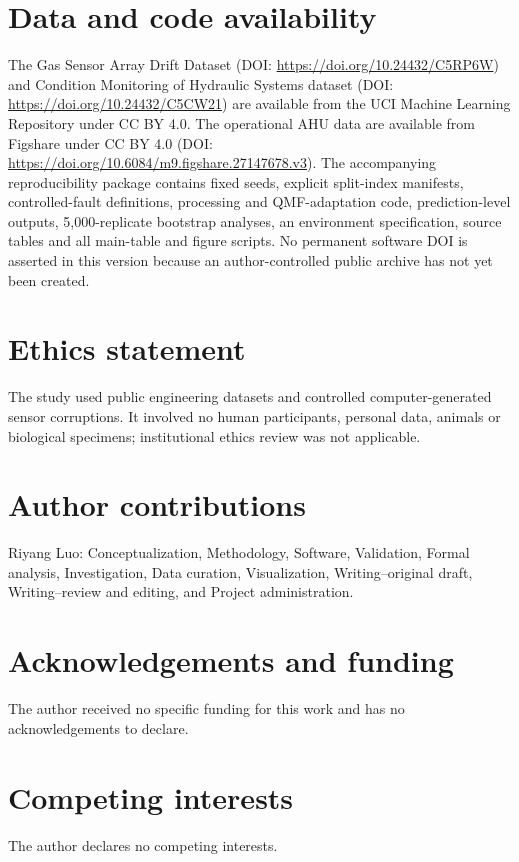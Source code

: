 \documentclass[11pt]{article}
\begin{document}
\section*{Data and code availability}

The Gas Sensor Array Drift Dataset (DOI: \url{https://doi.org/10.24432/C5RP6W}) and Condition Monitoring of Hydraulic Systems dataset (DOI: \url{https://doi.org/10.24432/C5CW21}) are available from the UCI Machine Learning Repository under CC BY 4.0. The operational AHU data are available from Figshare under CC BY 4.0 (DOI: \url{https://doi.org/10.6084/m9.figshare.27147678.v3}). The accompanying reproducibility package contains fixed seeds, explicit split-index manifests, controlled-fault definitions, processing and QMF-adaptation code, prediction-level outputs, 5,000-replicate bootstrap analyses, an environment specification, source tables and all main-table and figure scripts. No permanent software DOI is asserted in this version because an author-controlled public archive has not yet been created.

\section*{Ethics statement}

The study used public engineering datasets and controlled computer-generated sensor corruptions. It involved no human participants, personal data, animals or biological specimens; institutional ethics review was not applicable.

\section*{Author contributions}

Riyang Luo: Conceptualization, Methodology, Software, Validation, Formal analysis, Investigation, Data curation, Visualization, Writing--original draft, Writing--review and editing, and Project administration.

\section*{Acknowledgements and funding}

The author received no specific funding for this work and has no acknowledgements to declare.

\section*{Competing interests}

The author declares no competing interests.



\end{document}
